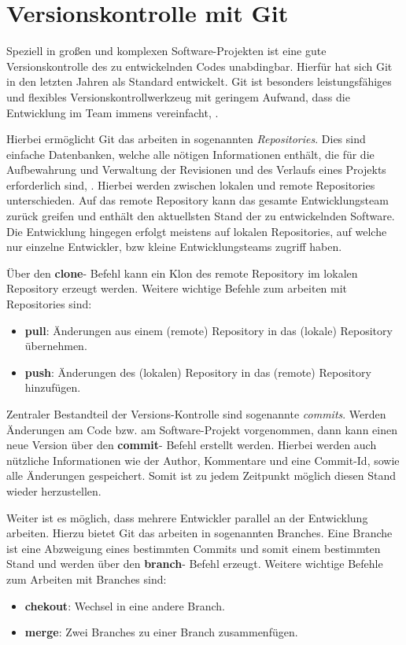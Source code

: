 \chapter{Versionskontrolle mit Git}

Speziell in großen und komplexen Software-Projekten ist eine gute Versionskontrolle des zu entwickelnden Codes unabdingbar.
Hierfür hat sich Git in den letzten Jahren als Standard entwickelt. Git ist besonders leistungsfähiges und flexibles Versionskontrollwerkzeug mit geringem Aufwand, dass die Entwicklung im Team immens vereinfacht, \cite{Loeliger:2012}.

Hierbei ermöglicht Git das arbeiten in sogenannten \textit{Repositories}. Dies sind einfache Datenbanken, welche alle nötigen Informationen enthält, die für die Aufbewahrung und Verwaltung der Revisionen und des Verlaufs eines Projekts erforderlich sind, \cite{Loeliger:2012}. Hierbei werden zwischen lokalen und remote Repositories unterschieden. Auf das remote Repository kann das gesamte Entwicklungsteam zurück greifen und enthält den aktuellsten Stand der zu entwickelnden Software. Die Entwicklung hingegen erfolgt meistens auf lokalen Repositories, auf welche nur einzelne Entwickler, bzw kleine Entwicklungsteams zugriff haben.

Über den \textbf{clone}- Befehl kann ein Klon des remote Repository im lokalen Repository erzeugt werden.
Weitere wichtige Befehle zum arbeiten mit Repositories sind:
\begin{itemize}
	\item  \textbf{pull}:
	Änderungen aus einem (remote) Repository in das (lokale) Repository übernehmen.
	\item  \textbf{push}:
	Änderungen des (lokalen) Repository in das (remote) Repository hinzufügen.
\end{itemize}

Zentraler Bestandteil der Versions-Kontrolle sind sogenannte \textit{commits}. Werden Änderungen am Code bzw. am Software-Projekt vorgenommen, dann kann einen neue Version über den \textbf{commit}- Befehl erstellt werden. Hierbei werden auch nützliche Informationen wie der Author, Kommentare und eine Commit-Id, sowie alle Änderungen gespeichert. Somit ist zu jedem Zeitpunkt möglich diesen Stand wieder herzustellen.

Weiter ist es möglich, dass mehrere Entwickler parallel an der Entwicklung arbeiten. Hierzu bietet Git das arbeiten in sogenannten Branches. Eine Branche ist eine Abzweigung eines bestimmten Commits und somit einem bestimmten Stand und werden über den \textbf{branch}- Befehl erzeugt. Weitere wichtige Befehle zum Arbeiten mit Branches sind:
\begin{itemize}
	\item  \textbf{chekout}:
	Wechsel in eine andere Branch.
	\item  \textbf{merge}:
	Zwei Branches zu einer Branch zusammenfügen.
\end{itemize}  

